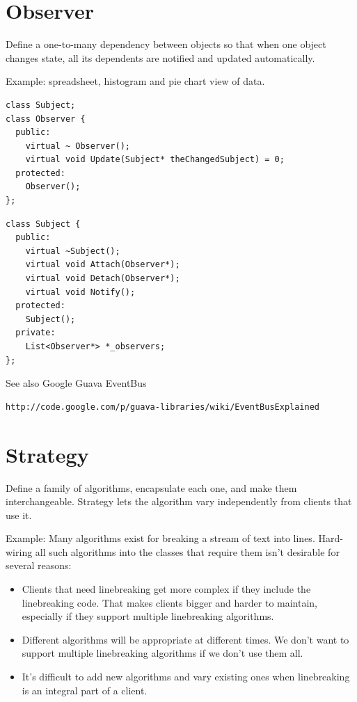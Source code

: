 \documentclass[11pt]{report}
\begin{document}
\section{Observer}

Define a one-to-many dependency between objects so that when 
one object changes state, all its dependents are notified and updated
automatically.

Example: spreadsheet, histogram and pie chart view of data. 

\begin{lstlisting}
class Subject;
class Observer {
  public:
    virtual ~ Observer();
    virtual void Update(Subject* theChangedSubject) = 0;
  protected:
    Observer();
};
\end{lstlisting}

\begin{lstlisting}
class Subject {
  public:
    virtual ~Subject();
    virtual void Attach(Observer*);
    virtual void Detach(Observer*);
    virtual void Notify();
  protected:
    Subject();
  private:
    List<Observer*> *_observers;
};
\end{lstlisting}

See also Google Guava EventBus
\begin{verbatim}
http://code.google.com/p/guava-libraries/wiki/EventBusExplained
\end{verbatim}

\section{Strategy}
Define a family of algorithms, encapsulate each one, and make them interchangeable. 
Strategy lets the algorithm vary independently from clients that use it.

Example: Many algorithms exist for breaking a stream of text into lines.
Hard-wiring all such algorithms into the classes that require them isn't desirable for several reasons:
\begin{itemize}
\item Clients that need linebreaking get more complex if they include
the linebreaking code. That makes clients bigger and harder to maintain, especially if they support multiple linebreaking algorithms.
\item Different algorithms will be appropriate at different times. We don't want to support multiple 
linebreaking algorithms if we don't use them all.
\item It's difficult to add new algorithms and vary existing ones when linebreaking is an integral part of a client.
\end{itemize}
\end{document}
